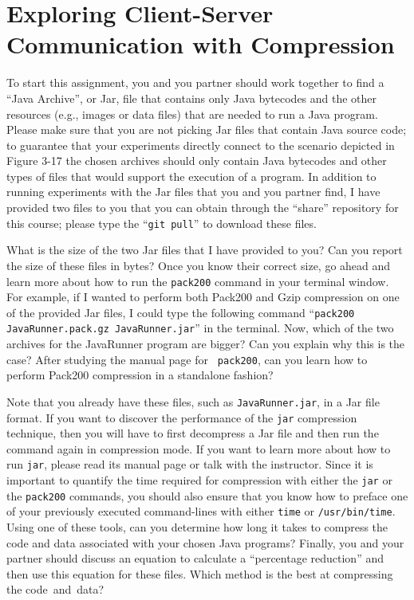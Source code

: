 \section*{Exploring Client-Server Communication with Compression}

To start this assignment, you and you partner should work together to find a ``Java Archive'', or Jar, file that
contains only Java bytecodes and the other resources (e.g., images or data files) that are needed to run a Java program.
Please make sure that you are not picking Jar files that contain Java source code; to guarantee that your experiments
directly connect to the scenario depicted in Figure 3-17 the chosen archives should only contain Java bytecodes and
other types of files that would support the execution of a program. In addition to running experiments with the Jar
files that you and you partner find, I have provided two files to you that you can obtain through the ``share''
repository for this course; please type the ``{\tt git pull}'' to download these files.

What is the size of the two Jar files that I have provided to you? Can you report the size of these files in bytes? Once
you know their correct size, go ahead and learn more about how to run the {\tt pack200} command in your terminal window.
For example, if I wanted to perform both Pack200 and Gzip compression on one of the provided Jar files, I could type the
following command ``{\tt pack200 JavaRunner.pack.gz JavaRunner.jar}'' in the terminal. Now, which of the two archives
for the JavaRunner program are bigger? Can you explain why this is the case? After studying the manual page for {\tt
pack200}, can you learn how to perform Pack200 compression in a standalone fashion?

Note that you already have these files, such as {\tt JavaRunner.jar}, in a Jar file format. If you want to discover the
performance of the {\tt jar} compression technique, then you will have to first decompress a Jar file and then run the
command again in compression mode. If you want to learn more about how to run {\tt jar}, please read its manual page or
talk with the instructor.  Since it is important to quantify the time required for compression with either the {\tt jar}
or the {\tt pack200} commands, you should also ensure that you know how to preface one of your previously executed
command-lines with either {\tt time} or {\tt /usr/bin/time}. Using one of these tools, can you determine how long it
takes to compress the code and data associated with your chosen Java programs? Finally, you and your partner should
discuss an equation to calculate a ``percentage reduction'' and then use this equation for these files. Which method
is the best at compressing the \mbox{code and data?}

